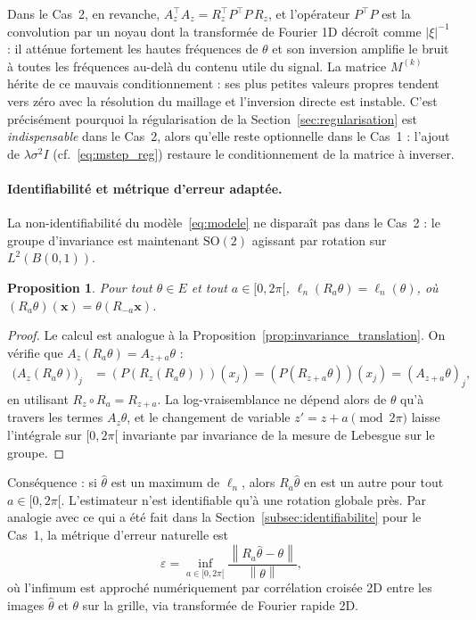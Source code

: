 \documentclass[12pt, a4paper]{article}
\newtheorem{proposition}[theorem]{Proposition}
\theoremstyle{definition}
\newcommand{\norm}[1]{\left\|#1\right\|}
\begin{document}
Dans le Cas~2, en revanche, $A_z^\top A_z = R_z^\top P^\top P\, R_z$, et
l'opérateur $P^\top P$ est la convolution par un noyau dont la transformée
de Fourier 1D décroît comme $|\xi|^{-1}$ : il atténue fortement les hautes
fréquences de $\theta$ et son inversion amplifie le bruit à toutes les
fréquences au-delà du contenu utile du signal.
La matrice $M^{(k)}$ hérite de ce mauvais conditionnement : ses plus petites
valeurs propres tendent vers zéro avec la résolution du maillage et
l'inversion directe est instable.
C'est précisément pourquoi la régularisation de la
Section~\ref{sec:regularisation} est \emph{indispensable} dans le Cas~2,
alors qu'elle reste optionnelle dans le Cas~1 : l'ajout de $\lambda\sigma^2 I$
(cf.~\eqref{eq:mstep_reg}) restaure le conditionnement de la matrice à inverser.

\paragraph{Identifiabilité et métrique d'erreur adaptée.}
La non-identifiabilité du modèle~\eqref{eq:modele} ne disparaît pas dans le
Cas~2 : le groupe d'invariance est maintenant $\mathrm{SO}(2)$ agissant par
rotation sur $L^2(B(0,1))$.

\begin{proposition}
\label{prop:invariance_so2}
Pour tout $\theta \in E$ et tout $a \in [0, 2\pi[$,
$\ell_n(R_a\theta) = \ell_n(\theta)$, où $(R_a\theta)(\mathbf{x}) = \theta(R_{-a}\mathbf{x})$.
\end{proposition}

\begin{proof}
Le calcul est analogue à la Proposition~\ref{prop:invariance_translation}.
On vérifie que $A_z(R_a\theta) = A_{z+a}\theta$ :
\begin{align*}
  \bigl(A_z(R_a\theta)\bigr)_j
  &= (P(R_z(R_a\theta)))(x_j)
   = (P(R_{z+a}\theta))(x_j)
   = (A_{z+a}\theta)_j,
\end{align*}
en utilisant $R_z \circ R_a = R_{z+a}$. La log-vraisemblance ne dépend alors de
$\theta$ qu'à travers les termes $A_z\theta$, et le changement de variable
$z' = z + a \pmod{2\pi}$ laisse l'intégrale sur $[0, 2\pi[$ invariante par
invariance de la mesure de Lebesgue sur le groupe.
\end{proof}

Conséquence : si $\hat\theta$ est un maximum de $\ell_n$, alors $R_a\hat\theta$
en est un autre pour tout $a \in [0, 2\pi[$. L'estimateur n'est identifiable
qu'à une rotation globale près. Par analogie avec ce qui a été fait dans
la Section~\ref{subsec:identifiabilite} pour le Cas~1, la métrique d'erreur
naturelle est
\[
  \varepsilon = \inf_{a \in [0, 2\pi[}
  \frac{\norm{R_a\hat\theta - \theta}}{\norm{\theta}},
\]
où l'infimum est approché numériquement par corrélation croisée 2D entre
les images $\hat\theta$ et $\theta$ sur la grille, via transformée de Fourier
rapide 2D.
\end{document}

